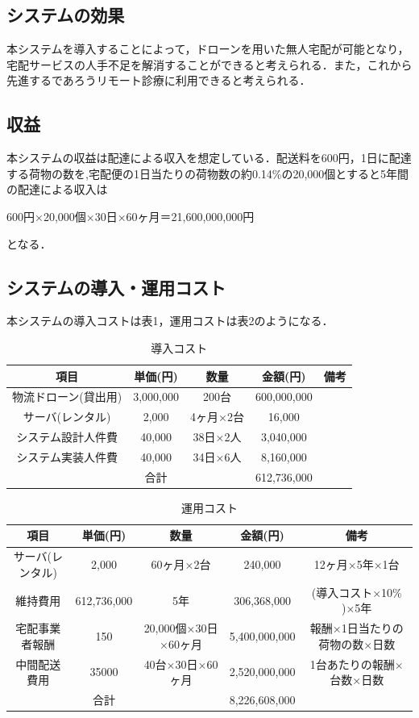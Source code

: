 \documentclass[a4paper, titlepage]{jsarticle}
\begin{document}
\subsection{システムの効果}
本システムを導入することによって，ドローンを用いた無人宅配が可能となり，宅配サービスの人手不足を解消することができると考えられる．また，これから先進するであろうリモート診療に利用できると考えられる．

\subsection{収益}
本システムの収益は配達による収入を想定している．配送料を600円，1日に配達する荷物の数を,宅配便の1日当たりの荷物数の約0.14\%の20,000個とすると5年間の配達による収入は
\begin{center}
    600円×20,000個×30日×60ヶ月＝21,600,000,000円
\end{center}
となる．

\subsection{システムの導入・運用コスト}
本システムの導入コストは表1，運用コストは表2のようになる．
\begin{table}[htbp]
    \centering
    \begin{tabular}{c c c c c}
    \hline
    項目 & 単価(円) & 数量 & 金額(円) & 備考 \\
    \hline \hline
    物流ドローン(貸出用) & 3,000,000 & 200台 & 600,000,000 &  \\
    サーバ(レンタル) & 2,000 & 4ヶ月×2台 & 16,000 & \\
    システム設計人件費 & 40,000 & 38日×2人 & 3,040,000 & \\
    システム実装人件費 & 40,000 & 34日×6人 & 8,160,000 & \\
    \hline \hline
     & 合計 &  & 612,736,000 &  \\
    \hline
    \end{tabular}
    \caption{導入コスト}
    \label{tab:label1}
\end{table}

\begin{table}[htbp]
    \centering
    \begin{tabular}{c c c c c}
    \hline
    項目 & 単価(円) & 数量 & 金額(円) & 備考 \\
    \hline \hline
    サーバ(レンタル) & 2,000 & 60ヶ月×2台 & 240,000 & 12ヶ月×5年×1台 \\
    維持費用 & 612,736,000 & 5年 & 306,368,000 & (導入コスト×10\% )×5年 \\
    宅配事業者報酬 & 150 & 20,000個×30日×60ヶ月 & 5,400,000,000 & 報酬×1日当たりの荷物の数×日数 \\
    中間配送費用 & 35000 & 40台×30日×60ヶ月 & 2,520,000,000 & 1台あたりの報酬×台数×日数 \\
    \hline \hline
     & 合計 &  & 8,226,608,000 &  \\
    \hline
    \end{tabular}
    \caption{運用コスト}
    \label{tab:label2}
\end{table}
\end{document}

